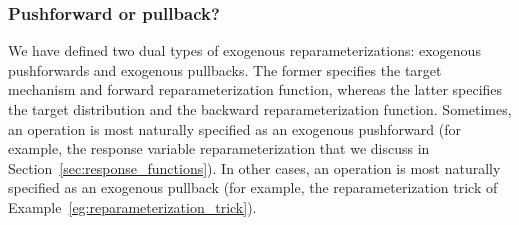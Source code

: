 \subsubsection{Pushforward or pullback?}

We have defined two dual types of exogenous reparameterizations: exogenous pushforwards and exogenous pullbacks.
The former specifies the target mechanism and forward reparameterization function, whereas the latter specifies the target distribution and the backward reparameterization function.
Sometimes, an operation is most naturally specified as an exogenous pushforward (for example, the response variable reparameterization that we discuss in Section~\ref{sec:response_functions}).
In other cases, an operation is most naturally specified as an exogenous pullback (for example, the reparameterization trick of Example~\ref{eg:reparameterization_trick}).

